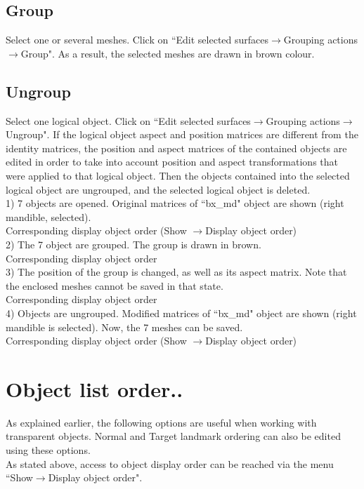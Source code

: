 \subsection{Group}
Select one or several meshes. Click on ``Edit selected surfaces$\rightarrow$Grouping actions$\rightarrow$Group". As a result, the selected meshes are drawn in brown colour.
\subsection{Ungroup}
Select one logical object. Click on ``Edit selected surfaces$\rightarrow$Grouping actions$\rightarrow$Ungroup". If the logical object aspect and position matrices are different from the identity matrices, the position and aspect matrices of the contained objects are edited in order to take into account position and aspect transformations that were applied to that logical object. Then the objects contained into the selected logical object are ungrouped, and the selected logical object is deleted.\\

1) 7 objects are opened. Original matrices of ``bx\_md" object are shown (right mandible, selected).\\
Corresponding display object order (Show $\rightarrow$Display object order)\\
2) The 7 object are grouped. The group is drawn in brown. \\
Corresponding display object order\\

3) The position of the group is changed, as well as its aspect matrix. Note that the enclosed meshes cannot be saved in that state.\\
Corresponding display object order\\

4) Objects are ungrouped. Modified matrices of ``bx\_md" object are shown (right mandible is selected). Now, the 7 meshes can be saved.\\
Corresponding display object order (Show $\rightarrow$Display object order)

\section{Object list order..}
As explained earlier, the following options are useful when working with transparent objects. Normal and Target landmark ordering can also be edited using these options.
\\As stated above, access to object display order can be reached via the menu ``Show$\rightarrow$Display object order".

